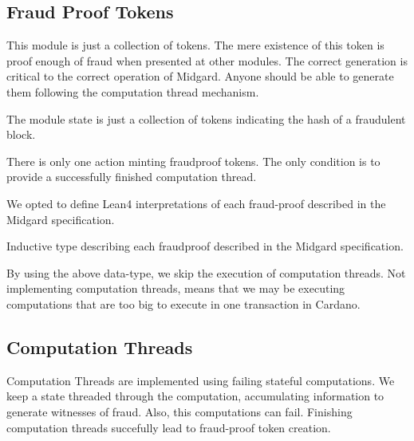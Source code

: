 \subsection{Fraud Proof Tokens}
%
This module is just a collection of tokens.
%
The mere existence of this token is proof enough of fraud when presented at
other modules.
%
The correct generation is critical to the correct operation of Midgard.
%
Anyone should be able to generate them following the computation thread
mechanism.

\begin{definition}
  \leanok
  \label{dfn:FraudProofTokens.State.FraudProofTokens}
  The module state is just a collection of tokens indicating the hash of a
fraudulent block. 
  \end{definition}

\begin{definition}[Relation]
  \leanok
  \label{dfn:FraudProofTokens.State.FraudProofTokens}
  There is only one action minting fraudproof tokens.
  The only condition is to provide a successfully finished computation thread.
\end{definition}

We opted to define Lean4 interpretations of each fraud-proof described in the
Midgard specification.
%
\begin{definition}
  \label{dfn:ProofProtocol.Catalogue.FraudProof}
  \leanok
  Inductive type describing each fraudproof described in the Midgard specification.
\end{definition}

By using the above data-type, we skip the execution of computation threads.
%
Not implementing computation threads, means that we may be executing
computations that are too big to execute in one transaction in Cardano.

\subsection{Computation Threads}\label{sec:computation_threads}

Computation Threads are implemented using failing stateful computations.
%
We keep a state threaded through the computation, accumulating information to
generate witnesses of fraud.
%
Also, this computations can fail.
%
Finishing  computation threads succefully lead to fraud-proof token creation.

